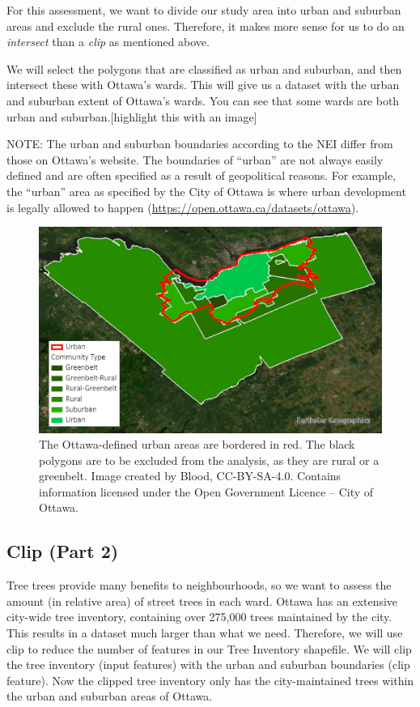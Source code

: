 \documentclass[
]{book}
\begin{document}
For this assessment, we want to divide our study area into urban and suburban areas and exclude the rural ones. Therefore, it makes more sense for us to do an \emph{intersect} than a \emph{clip} as mentioned above.

We will select the polygons that are classified as urban and suburban, and then intersect these with Ottawa's wards. This will give us a dataset with the urban and suburban extent of Ottawa's wards. You can see that some wards are both urban and suburban.{[}highlight this with an image{]}

NOTE: The urban and suburban boundaries according to the NEI differ from those on Ottawa's website. The boundaries of ``urban'' are not always easily defined and are often specified as a result of geopolitical reasons. For example, the ``urban'' area as specified by the City of Ottawa is where urban development is legally allowed to happen (\url{https://open.ottawa.ca/datasets/ottawa}).

\begin{figure}
\includegraphics[width=0.75\linewidth]{images/06-urban-discrepancy} \caption{The Ottawa-defined urban areas are bordered in red. The black polygons are to be excluded from the analysis, as they are rural or a greenbelt. Image created by Blood, CC-BY-SA-4.0. Contains information licensed under the Open Government Licence – City of Ottawa.}\label{fig:6-urban-discrepancy}
\end{figure}

\hypertarget{clip-part-2}{%
\subsection{Clip (Part 2)}\label{clip-part-2}}

Tree trees provide many benefits to neighbourhoods, so we want to assess the amount (in relative area) of street trees in each ward. Ottawa has an extensive city-wide tree inventory, containing over 275,000 trees maintained by the city.
This results in a dataset much larger than what we need. Therefore, we will use clip to reduce the number of features in our Tree Inventory shapefile. We will clip the tree inventory (input features) with the urban and suburban boundaries (clip feature). Now the clipped tree inventory only has the city-maintained trees within the urban and suburban areas of Ottawa.
\end{document}
